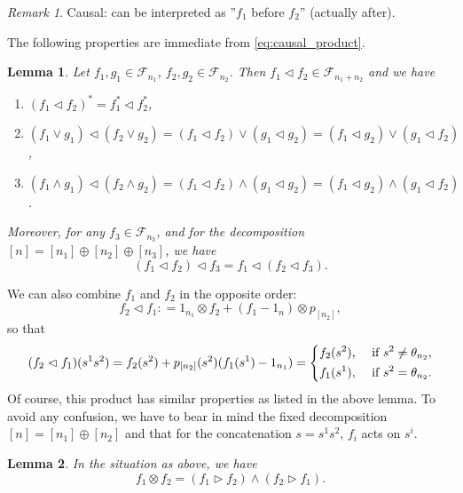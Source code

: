 \documentclass[12pt]{article}
\newtheorem{lemma}{Lemma}
\theoremstyle{definition}
\theoremstyle{remark}
\newtheorem{remark}{Remark}
\def\Fe{\mathcal F}
\def\vtl{\vartriangleleft}
\def\vtr{\vartriangleright}
\begin{document}
\begin{remark} Causal: can be interpreted as ''$f_1$ before $f_2$'' (actually after).


\end{remark}

The following properties are immediate from \eqref{eq:causal_product}. 

\begin{lemma}\label{lemma:causal_product}
Let $f_1,g_1\in \Fe_{n_1}$, $f_2,g_2\in \Fe_{n_2}$. Then $f_1\vartriangleleft f_2\in \Fe_{n_1+n_2}$ and we
have 
\begin{enumerate}
\item[(i)] $(f_1\vtl f_2)^*=f_1^*\vtl f_2^*$,
\item[(ii)]$(f_1\vee g_1)\vtl (f_2\vee g_2)=(f_1\vtl f_2)\vee ( g_1\vtl g_2)=(f_1\vtl
g_2)\vee (g_1\vtl f_2)$,
\item[(iii)] $(f_1\wedge g_1)\vtl (f_2\wedge g_2)=(f_1\vtl f_2)\wedge ( g_1\vtl g_2)=(f_1\vtl
g_2)\wedge (g_1\vtl f_2)$.
\end{enumerate}
Moreover, for any $f_3\in \Fe_{n_3}$, and for the decomposition $[n]=[n_1]\oplus
[n_2]\oplus [n_3]$, we have 
\[
(f_1\vtl f_2)\vtl f_3=f_1\vtl (f_2\vtl f_3).
\]
\end{lemma}



We can also combine $f_1$ and $f_2$ in the opposite order:
\[
f_2\vtl f_1: =1_{n_1}\otimes f_2+(f_1-1_n)\otimes p_{[n_2]},
\]
so that
\begin{equation}\label{eq:causal_product_op}
(f_2\vtl f_1)(s^1s^2)=f_2(s^2)+p_{[n_2]}(s^2)(f_1(s^1)-1_{n_1})=\begin{dcases} f_2(s^2), & \text{ if }
s^2\ne \theta_{n_2},\\
   f_1(s^1), & \text{ if } s^2=\theta_{n_2}.
   \end{dcases}
\end{equation}
Of course, this product has similar properties as listed in the above lemma.
To avoid any confusion, we have to bear in mind the fixed decomposition $[n]=[n_1]\oplus
[n_2]$ and that for the concatenation $s=s^1s^2$, $f_i$ acts on $s^i$. 

\begin{lemma}\label{lemma:causal_tensor} In the situation as above, we have
\[
f_1\otimes f_2 = (f_1\vtr f_2)\wedge (f_2\vtr f_1).
\]

\end{lemma}
\end{document}
